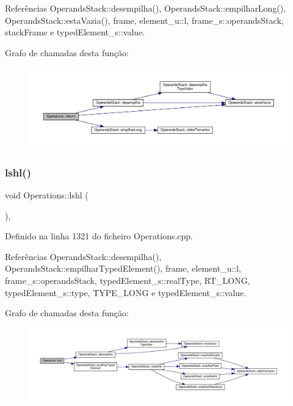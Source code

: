 Referências Operands\+Stack\+::desempilha(), Operands\+Stack\+::empilhar\+Long(), Operands\+Stack\+::esta\+Vazia(), frame, element\+\_\+u\+::l, frame\+\_\+s\+::operands\+Stack, stack\+Frame e typed\+Element\+\_\+s\+::value.

Grafo de chamadas desta função\+:\nopagebreak
\begin{figure}[H]
\begin{center}
\leavevmode
\includegraphics[width=350pt]{classOperations_adbc4db2dbfcae7185bc9b7a005e988ea_cgraph}
\end{center}
\end{figure}
\mbox{\label{classOperations_a9d2b2a5ea74f26e6a5005ec9e99b24d9}} 
\subsubsection{\texorpdfstring{lshl()}{lshl()}}
{\footnotesize\ttfamily void Operations\+::lshl (\begin{DoxyParamCaption}{ }\end{DoxyParamCaption})\hspace{0.3cm}{\ttfamily [static]}, {\ttfamily [private]}}



Definido na linha 1321 do ficheiro Operations.\+cpp.



Referências Operands\+Stack\+::desempilha(), Operands\+Stack\+::empilhar\+Typed\+Element(), frame, element\+\_\+u\+::l, frame\+\_\+s\+::operands\+Stack, typed\+Element\+\_\+s\+::real\+Type, R\+T\+\_\+\+L\+O\+NG, typed\+Element\+\_\+s\+::type, T\+Y\+P\+E\+\_\+\+L\+O\+NG e typed\+Element\+\_\+s\+::value.

Grafo de chamadas desta função\+:\nopagebreak
\begin{figure}[H]
\begin{center}
\leavevmode
\includegraphics[width=350pt]{classOperations_a9d2b2a5ea74f26e6a5005ec9e99b24d9_cgraph}
\end{center}
\end{figure}
\mbox{\label{classOperations_aa886b0d027fb5b030016af6100541e81}} 
